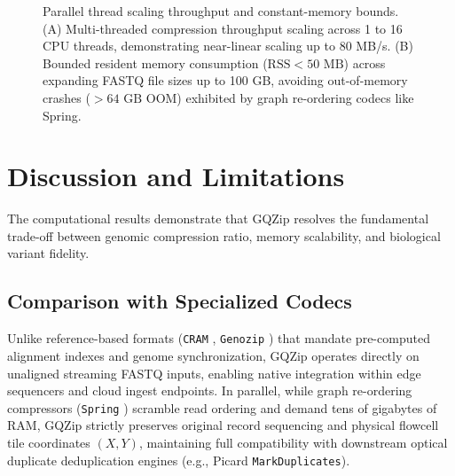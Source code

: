 \documentclass[10pt,twocolumn,a4paper]{article}
\begin{document}
\begin{figure}[t!]
\caption{Parallel thread scaling throughput and constant-memory bounds. (A) Multi-threaded compression throughput scaling across 1 to 16 CPU threads, demonstrating near-linear scaling up to 80 MB/s. (B) Bounded resident memory consumption ($\text{RSS} < 50\text{ MB}$) across expanding FASTQ file sizes up to 100 GB, avoiding out-of-memory crashes ($>64\text{ GB}$ OOM) exhibited by graph re-ordering codecs like Spring.}
\label{fig:performance}
\vspace{0.15in}
\end{figure}

\section{Discussion and Limitations}
The computational results demonstrate that GQZip resolves the fundamental trade-off between genomic compression ratio, memory scalability, and biological variant fidelity.

\subsection{Comparison with Specialized Codecs}
Unlike reference-based formats (\texttt{CRAM} \cite{cram}, \texttt{Genozip} \cite{genozip}) that mandate pre-computed alignment indexes and genome synchronization, GQZip operates directly on unaligned streaming FASTQ inputs, enabling native integration within edge sequencers and cloud ingest endpoints. In parallel, while graph re-ordering compressors (\texttt{Spring} \cite{spring}) scramble read ordering and demand tens of gigabytes of RAM, GQZip strictly preserves original record sequencing and physical flowcell tile coordinates $(X, Y)$, maintaining full compatibility with downstream optical duplicate deduplication engines (e.g., Picard \texttt{MarkDuplicates}).
\end{document}
